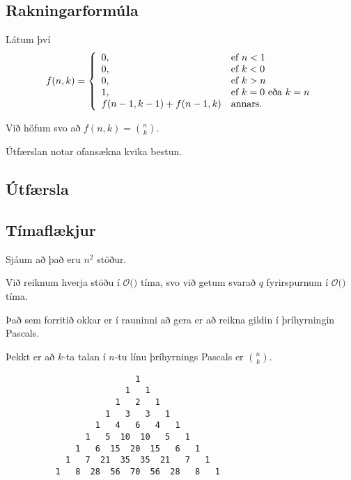 \subsection{Rakningarformúla}
{
    {
        \item<1-> Látum því
        \[
            f(n, k) = \left \{
            \env{array}
            { {l l}
                0, & \text{ef $n < 1$}\\
                0, & \text{ef $k < 0$}\\
                0, & \text{ef $k > n$}\\
                1, & \text{ef $k = 0$ eða $k = n$}\\
                f(n - 1, k - 1) + f(n - 1, k) & \text{annars.}
            }
            \right .
        \]
        \item<2-> Við höfum svo að $f(n, k) = {n \choose k}$.
        \item<3-> Útfærslan notar ofansækna kvika bestun.
    }
}

\subsection{Útfærsla}
{
}

\subsection{Tímaflækjur}
{
    {
        \item<1-> Sjáum að það eru $n^2$ stöður.
        \item<2-> Við reiknum hverja stöðu í $\mathcal{O}($$)$ tíma, svo við getum svarað $q$ fyrirspurnum í
                    $\mathcal{O}($$)$ tíma.
        \item<5-> Það sem forritið okkar er í rauninni að gera er að reikna gildin í þríhyrningin Pascals.
        \item<6-> Þekkt er að $k$-ta talan í $n$-tu línu þríhyrnings Pascals er ${n \choose k}$.
    }
}

{ \begin{verbatim}
                          1
                        1   1
                      1   2   1
                    1   3   3   1
                  1   4   6   4   1
                1   5  10  10   5   1
              1   6  15  20  15   6   1
            1   7  21  35  35  21   7   1
          1   8  28  56  70  56  28   8   1





\end{verbatim}}
